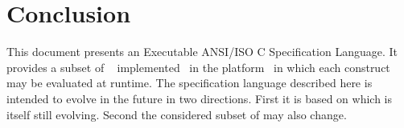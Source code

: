 
\chapter{Conclusion}

This document presents an Executable ANSI/ISO C Specification Language. It
provides a subset of \acsl~\cite{acsl} implemented~\cite{acslimplem} in the
\framac platform~\cite{framac} in which each construct may be evaluated at
runtime. The specification language described here is intended to evolve in the
future in two directions. First it is based on \acsl which is itself still
evolving. Second the considered subset of \acsl may also change.
